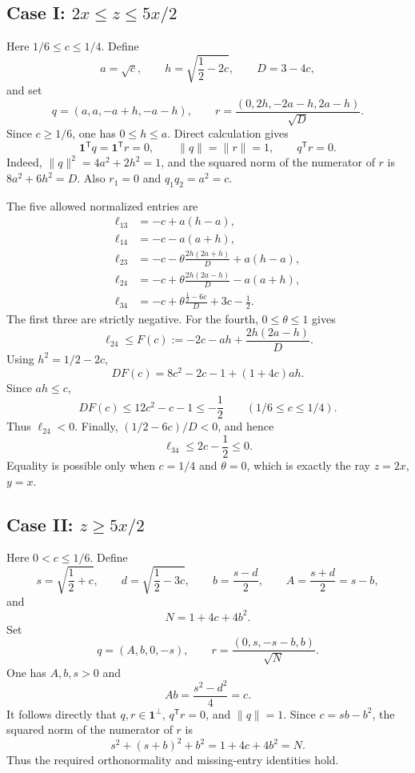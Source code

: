 \documentclass[11pt,reqno]{amsart}
\theoremstyle{definition}
\theoremstyle{remark}
\newcommand{\one}{\mathbf 1}
\begin{document}
\subsection*{\texorpdfstring{Case I: $2x\le z\le5x/2$}{Case I}}

Here $1/6\le c\le1/4$.  Define
\[
  a=\sqrt c,\qquad h=\sqrt{\frac12-2c},\qquad D=3-4c,
\]
and set
\begin{equation}\label{eq:q-r-case1}
  q=(a,a,-a+h,-a-h),
  \qquad
  r=\frac{(0,2h,-2a-h,2a-h)}{\sqrt D}.
\end{equation}
Since $c\ge1/6$, one has $0\le h\le a$.  Direct calculation gives
\[
  \one^{\mathsf T}q=\one^{\mathsf T}r=0,\qquad
  \|q\|=\|r\|=1,\qquad q^{\mathsf T}r=0.
\]
Indeed, $\|q\|^2=4a^2+2h^2=1$, and the squared norm of the
numerator of $r$ is $8a^2+6h^2=D$.  Also $r_1=0$ and
$q_1q_2=a^2=c$.

The five allowed normalized entries are
\begin{align*}
  \ell_{13}&=-c+a(h-a),\\
  \ell_{14}&=-c-a(a+h),\\
  \ell_{23}&=-c-\theta\frac{2h(2a+h)}D+a(h-a),\\
  \ell_{24}&=-c+\theta\frac{2h(2a-h)}D-a(a+h),\\
  \ell_{34}&=-c+\theta\frac{\frac12-6c}{D}+3c-\frac12.
\end{align*}
The first three are strictly negative.  For the fourth, $0\le\theta\le1$
gives
\[
  \ell_{24}\le F(c):=-2c-ah+\frac{2h(2a-h)}D.
\]
Using $h^2=1/2-2c$,
\[
  DF(c)=8c^2-2c-1+(1+4c)ah.
\]
Since $ah\le c$,
\[
  DF(c)\le12c^2-c-1\le-\frac12
  \qquad(1/6\le c\le1/4).
\]
Thus $\ell_{24}<0$.  Finally, $(1/2-6c)/D<0$, and hence
\[
  \ell_{34}\le2c-\frac12\le0.
\]
Equality is possible only when $c=1/4$ and $\theta=0$, which is exactly the
ray $z=2x$, $y=x$.

\subsection*{\texorpdfstring{Case II: $z\ge5x/2$}{Case II}}

Here $0<c\le1/6$.  Define
\[
  s=\sqrt{\frac12+c},\qquad
  d=\sqrt{\frac12-3c},\qquad
  b=\frac{s-d}{2},\qquad A=\frac{s+d}{2}=s-b,
\]
and
\[
  N=1+4c+4b^2.
\]
Set
\begin{equation}\label{eq:q-r-case2}
  q=(A,b,0,-s),
  \qquad
  r=\frac{(0,s,-s-b,b)}{\sqrt N}.
\end{equation}
One has $A,b,s>0$ and
\[
  Ab=\frac{s^2-d^2}{4}=c.
\]
It follows directly that $q,r\in\one^\perp$, $q^{\mathsf T}r=0$, and
$\|q\|=1$.  Since $c=sb-b^2$, the squared norm of the numerator of $r$ is
\[
  s^2+(s+b)^2+b^2=1+4c+4b^2=N.
\]
Thus the required orthonormality and missing-entry identities hold.
\end{document}
